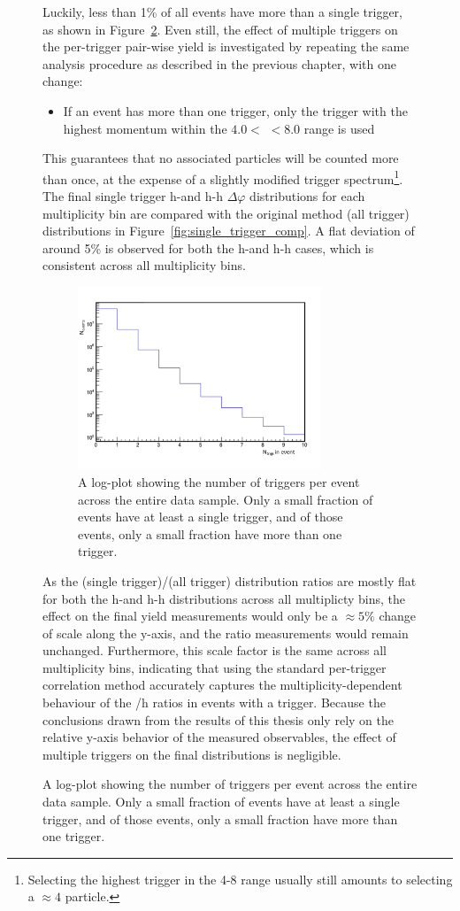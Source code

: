 \begin{figure}
Luckily, less than 1\% of all events have more than a single trigger, as shown in Figure~\ref{fig:trigs_per_event}. Even still, the effect of multiple triggers on the per-trigger pair-wise yield is investigated by repeating the same analysis procedure as described in the previous chapter, with one change:
%
\begin{itemize}
    \item If an event has more than one trigger, only the trigger with the highest momentum within the $4.0 <$ \pt $< 8.0$ \GeVc range is used
\end{itemize}
%
This guarantees that no associated particles will be counted more than once, at the expense of a slightly modified trigger \pt spectrum\footnote{Selecting the highest \pt trigger in the 4-8 \GeVc range usually still amounts to selecting a $\approx 4$ \GeVc particle.}. The final single trigger h-\lmb and h-h $\Delta\varphi$ distributions for each multiplicity bin are compared with the original method (all trigger) distributions in Figure~\ref{fig:single_trigger_comp}. A flat deviation of around 5\% is observed for both the h-\lmb and h-h cases, which is consistent across all multiplicity bins.

\begin{figure}[ht!]
    \centering
    \includegraphics[width=0.8\textwidth]{figures/analysis/trig_per_event.pdf}
    \caption{A log-plot showing the number of triggers per event across the entire data sample. Only a small fraction of events have at least a single trigger, and of those events, only a small fraction have more than one trigger.}
    \label{fig:trigs_per_event}
\end{figure}

As the (single trigger)/(all trigger) distribution ratios are mostly flat for both the h-\lmb and h-h distributions across all multiplicty bins, the effect on the final yield measurements would only be a $\approx 5\%$ change of scale along the y-axis, and the ratio measurements would remain unchanged. Furthermore, this scale factor is the same across all multiplicity bins, indicating that using the standard per-trigger correlation method accurately captures the multiplicity-dependent behaviour of the \lmb/h ratios in events with a trigger. Because the conclusions drawn from the results of this thesis only rely on the relative y-axis behavior of the measured observables, the effect of multiple triggers on the final distributions is negligible.



\end{figure}
